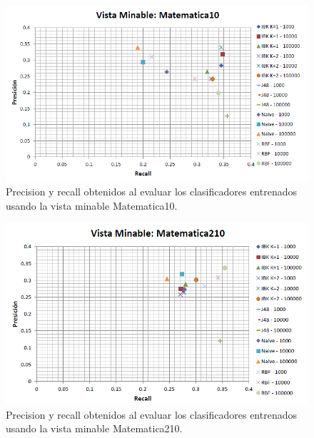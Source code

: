 \documentclass{article}
\begin{document}
\begin{figure}[!htb]
\begin{centering}
\includegraphics[scale=0.75]{matematica10}
\par\end{centering}
\caption{Precision y recall obtenidos al evaluar los clasificadores entrenados usando la vista minable Matematica10.}
\label{fig:figura8}
\end{figure}

\begin{figure}[!htb]
\begin{centering}
\includegraphics[scale=0.75]{matematica210}
\par\end{centering}
\caption{Precision y recall obtenidos al evaluar los clasificadores entrenados usando la vista minable Matematica210.}
\label{fig:figura9}
\end{figure}
\end{document}
